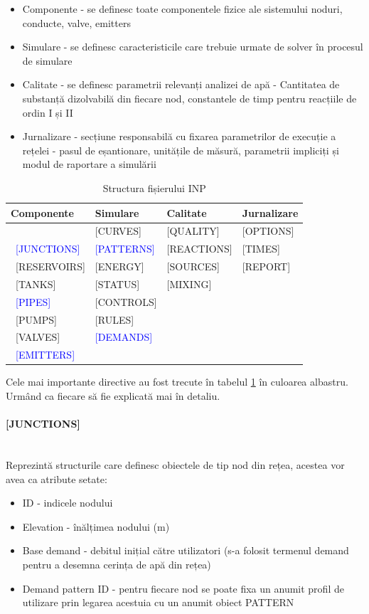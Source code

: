 \begin{itemize}
    \item Componente - se definesc toate componentele fizice ale sistemului noduri, conducte, valve, emitters
    \item Simulare - se definesc caracteristicile care trebuie urmate de solver în procesul de simulare
    \item Calitate - se definesc parametrii relevanți analizei de apă - Cantitatea de substanță dizolvabilă din fiecare nod, constantele de timp pentru reacțiile de ordin I și II
    \item Jurnalizare - secțiune responsabilă cu fixarea parametrilor de execuție a rețelei - pasul de eșantionare, unitățile de măsură, parametrii impliciți și modul de raportare a simulării
\end{itemize}



\begin{table}[H]
\begin{tabular}{ p{3cm} p{3cm} p{3cm} p{3cm} }

Componente  & Simulare  & Calitate  & Jurnalizare \\
 \hline
 [TITLE] & [CURVES] & [QUALITY] & [OPTIONS] \\\
 \textcolor{blue}{[JUNCTIONS]} & \textcolor{blue}{[PATTERNS]} & [REACTIONS] & [TIMES] \\\
 [RESERVOIRS]& [ENERGY]& [SOURCES] &[REPORT] \\\
 [TANKS]& [STATUS] &[MIXING]& \\\
 \textcolor{blue}{[PIPES]} & [CONTROLS] &  &  \\\
 [PUMPS] & [RULES] &  & \\\
 [VALVES] & \textcolor{blue}{[DEMANDS]} & & \\\
 \textcolor{blue}{[EMITTERS]} & & &
\end{tabular}
\caption{Structura fișierului INP} \label{tabel:INP_Structure}
\end{table}


Cele mai importante directive au fost trecute în tabelul \ref{tabel:INP_Structure} în culoarea albastru. Urmând ca fiecare să fie explicată mai în detaliu.

\paragraph{[JUNCTIONS]} \mbox{} \\
Reprezintă structurile care definesc obiectele de tip nod din rețea, acestea vor avea ca atribute setate:
\begin{itemize}
    \item ID - indicele nodului
    \item Elevation - înălțimea nodului (m)
    \item Base demand - debitul inițial către utilizatori (s-a folosit termenul demand pentru a desemna cerința de apă din rețea)
    \item Demand pattern ID - pentru fiecare nod se poate fixa un anumit profil de utilizare prin legarea acestuia cu un anumit obiect PATTERN
\end{itemize}

